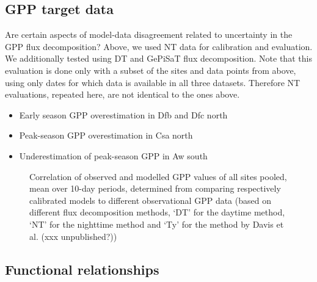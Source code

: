 \documentclass{myreport}
\begin{document}
\clearpage

\subsection{GPP target data}

Are certain aspects of model-data disagreement related to uncertainty in the GPP flux decomposition? Above, we used NT data for calibration and evaluation. We additionally tested using DT and GePiSaT flux decomposition. Note that this evaluation is done only with a subset of the sites and data points from above, using only dates for which data is available in all three datasets. Therefore NT evaluations, repeated here, are not identical to the ones above. 
\begin{itemize}
    \item Early season GPP overestimation in Dfb and Dfc north 
    \item Peak-season GPP overestimation in Csa north
    \item Underestimation of peak-season GPP in Aw south
\end{itemize}

\begin{figure}[!ht]
    \centering
    \caption{Correlation of observed and modelled GPP values of all sites pooled, mean over 10-day periods, determined from comparing respectively calibrated models to different observational GPP data (based on different flux decomposition methods, `DT' for the daytime method, `NT' for the nighttime method and `Ty' for the method by Davis et al. (xxx unpublished?))}
    \label{fig:modobs_10d_gppdata}
\end{figure}

\clearpage

\subsection{Functional relationships}
\end{document}
